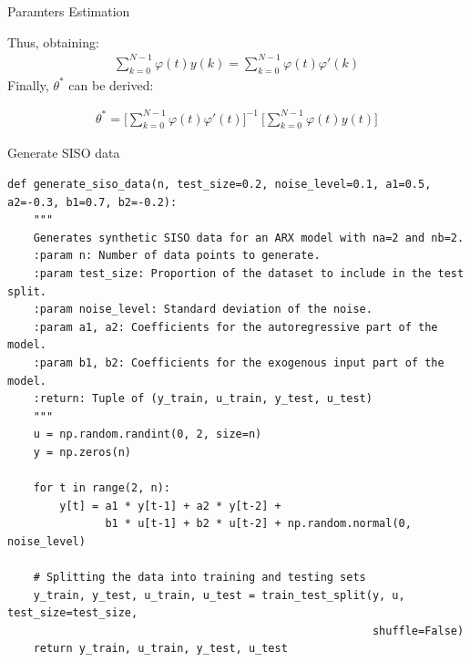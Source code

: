 \documentclass[aspectratio=169,hyperref={pdfpagelabels=false}]{beamer}
\begin{document}
\begin{frame}{Paramters Estimation}
  \begin{block}{}
    Thus, obtaining: 
\begin{align*}
  \sum_{k=0}^{N-1}\varphi(t)y(k) = \sum_{k=0}^{N-1}\varphi(t)\varphi'(k)
\end{align*}
Finally, $\theta^*$ can be derived: 
\begin{center}
\begin{tcolorbox}[width=0.6\linewidth, height = 0.22\linewidth, colframe=red]
    \begin{align*}
      \theta^* = \Biggr[\sum_{k=0}^{N-1}\varphi(t)\varphi'(t)\Biggr]^{-1} \: \Biggr[\sum_{k=0}^{N-1}\varphi(t)y(t)\Biggr]
    \end{align*}
\end{tcolorbox}
\end{center}
\end{block}
\end{frame}

\begin{frame}[fragile]{\small{Generate SISO data}}
  \begin{verbatim}
def generate_siso_data(n, test_size=0.2, noise_level=0.1, a1=0.5, a2=-0.3, b1=0.7, b2=-0.2):
    """
    Generates synthetic SISO data for an ARX model with na=2 and nb=2.
    :param n: Number of data points to generate.
    :param test_size: Proportion of the dataset to include in the test split.
    :param noise_level: Standard deviation of the noise.
    :param a1, a2: Coefficients for the autoregressive part of the model.
    :param b1, b2: Coefficients for the exogenous input part of the model.
    :return: Tuple of (y_train, u_train, y_test, u_test)
    """
    u = np.random.randint(0, 2, size=n)
    y = np.zeros(n)

    for t in range(2, n):
        y[t] = a1 * y[t-1] + a2 * y[t-2] +  
               b1 * u[t-1] + b2 * u[t-2] + np.random.normal(0, noise_level)

    # Splitting the data into training and testing sets
    y_train, y_test, u_train, u_test = train_test_split(y, u, test_size=test_size,
                                                        shuffle=False)
    return y_train, u_train, y_test, u_test
  \end{verbatim}
\end{frame}
\end{document}
